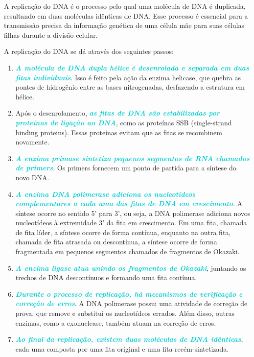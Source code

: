 \documentclass[11pt,a4paper]{article}
\begin{document}
	A replicação do DNA é o processo pelo qual uma molécula de DNA é duplicada, resultando em duas moléculas idênticas de DNA. Esse processo é essencial para a transmissão precisa da informação genética de uma célula mãe para suas células filhas durante a divisão celular.

	A replicação do DNA se dá através dos seguintes passos:

	\begin{enumerate}
		\item \textcolor{DarkTurquoise}{\textbf{\textit{A molécula de DNA dupla hélice é desenrolada e separada em duas fitas individuais}}}. Isso é feito pela ação da enzima helicase, que quebra as pontes de hidrogênio entre as bases nitrogenadas, desfazendo a estrutura em hélice.
		\item Após o desenrolamento, \textcolor{DarkTurquoise}{\textbf{\textit{as fitas de DNA são estabilizadas por proteínas de ligação ao DNA}}}, como as proteínas SSB (single-strand binding proteins). Essas proteínas evitam que as fitas se recombinem novamente.
		\item \textcolor{DarkTurquoise}{\textbf{\textit{A enzima primase sintetiza pequenos segmentos de RNA chamados de primers}}}. Os primers fornecem um ponto de partida para a síntese do novo DNA.
		\item \textcolor{DarkTurquoise}{\textbf{\textit{A enzima DNA polimerase adiciona os nucleotídeos complementares a cada uma das fitas de DNA em crescimento}}}. A síntese ocorre no sentido 5' para 3', ou seja, a DNA polimerase adiciona novos nucleotídeos à extremidade 3' da fita em crescimento. Em uma fita, chamada de fita líder, a síntese ocorre de forma contínua, enquanto na outra fita, chamada de fita atrasada ou descontínua, a síntese ocorre de forma fragmentada em pequenos segmentos chamados de fragmentos de Okazaki.
		\item \textcolor{DarkTurquoise}{\textbf{\textit{A enzima ligase atua unindo os fragmentos de Okazaki}}}, juntando os trechos de DNA descontínuos e formando uma fita contínua.
		\item \textcolor{DarkTurquoise}{\textbf{\textit{Durante o processo de replicação, há mecanismos de verificação e correção de erros}}}. A DNA polimerase possui uma atividade de correção de prova, que remove e substitui os nucleotídeos errados. Além disso, outras enzimas, como a exonuclease, também atuam na correção de erros.
		\item \textcolor{DarkTurquoise}{\textbf{\textit{Ao final da replicação, existem duas moléculas de DNA idênticas}}}, cada uma composta por uma fita original e uma fita recém-sintetizada.
	\end{enumerate}
\end{document}
